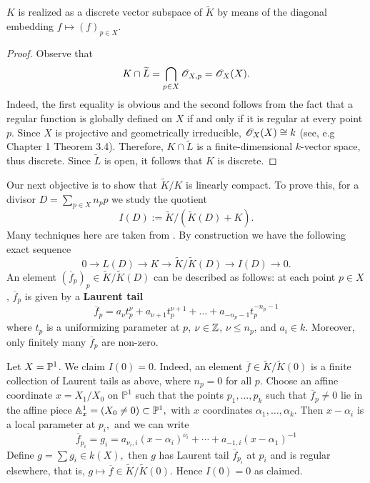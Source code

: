 \begin{proposition}\label{prop:K-discrete-in-adèle}
	$K$ is realized as a discrete vector subspace of $\widetilde{K}$ by means of the diagonal embedding $f \mapsto (f)_{p\in X}$. 
\end{proposition}
\begin{proof}
	Observe that 
	\[
		K\cap \widetilde{L} = \bigcap_{p\in X}\O_{X,p} = \O_{X}(X).
	\]
	Indeed, the first equality is obvious and the second follows from the fact that a regular function is globally defined on $X$ if and only if it is regular at every point $p$. Since $X$ is projective and geometrically irreducible, $\O_{X}(X) \cong k$ (see, e.g \cite{hartshorne} Chapter 1 Theorem 3.4). Therefore, $K\cap \widetilde{L}$ is a finite-dimensional $k$-vector space, thus discrete. Since $\widetilde{L}$ is open, it follows that $K$ is discrete. 
\end{proof}
Our next objective is to show that $\widetilde{K}/K$ is linearly compact. To prove this, for a divisor $D = \sum_{p\in X}n_{p}p$ we study the quotient
\[
	I(D) := \widetilde{K}/(\widetilde{K}(D) + K).
\]
Many techniques here are taken from \cite{fulton}. By construction we have the following exact sequence
\[
	0 \to L(D) \to K \to \widetilde{K}/\widetilde{K}(D) \to I(D) \to 0.
\]
An element $(\overline{f}_{p})_{p}\in \widetilde{K}/\widetilde{K}(D)$ can be described as follows: at each point $p \in X$, $\overline{f}_{p}$ is given by a \textbf{Laurent tail}
\[
	\overline{f}_{p} = a_{\nu}t_{p}^{\nu} + a_{\nu + 1}t_{p}^{\nu+1} + \ldots + a_{-n_{p}-1}t_{p}^{-n_{p}-1}
\]
where $t_{p}$ is a uniformizing parameter at $p$, $\nu\in \Z$, $\nu\leq n_{p}$, and $a_{i}\in k$. Moreover, only finitely many $\overline{f}_{p}$ are non-zero.
\begin{example}\label{ex:I(D)-for-P^1}
	Let $X = \P^{1}$. We claim $I(0) = 0$. Indeed, an element $\overline { f } \in \widetilde{K} / \widetilde{K} ( 0 )$ is a finite collection of Laurent tails as above, where $n _ { p } = 0$ for all $p .$ Choose an affine coordinate $x = X _ { 1 } / X _ { 0 }$ on $\mathbb { P } ^ { 1 }$ such that the points $p _ { 1 } , \ldots , p _ { k }$ such that $\overline { f } _ { p } \neq 0$ lie in the affine piece $\A _ { x } ^ { 1 } = \left( X _ { 0 } \neq 0 \right) \subset \mathbb { P } ^ { 1 } ,$ with $x$ coordinates $\alpha _ { 1 } , \ldots , \alpha _ { k } .$ Then $x - \alpha _ { i }$ is a local parameter at $p _ { i } ,$ and we can write 
	\[
		\overline { f } _ { p_ { i } } = g _ { i } = a _ { \nu _ { i } , i } \left( x - \alpha _ { i } \right) ^ { \nu _ { i } } + \cdots + a _ { - 1 , i } ( x - \alpha_{1} ) ^ { - 1 }
	\]
	Define $g = \sum g _ { i } \in k ( X ) ,$ then $g$ has Laurent tail $\overline { f } _ { p _ { i } }$ at $p _ { i }$ and is regular elsewhere, that is, $g \mapsto \overline { f } \in \widetilde{K}/ \widetilde{K} ( 0 ) .$ Hence $I ( 0 ) = 0$ as claimed.
\end{example}
